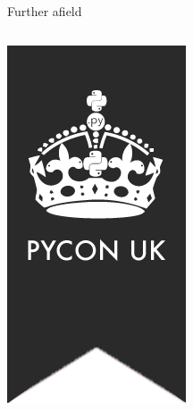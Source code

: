 \documentclass{beamer}
\begin{document}
\begin{frame}{Further afield}
    \begin{columns}[T]
        \begin{column}{.25\textwidth}
            \raggedleft%
            \vspace{10pt}
            \includegraphics[width=.9\linewidth]{pyconuk.png}
        \end{column}
        \begin{column}{.75\textwidth}

\end{column}
\end{columns}
\end{frame}
\end{document}
